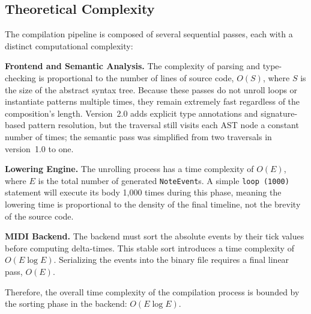 \subsection{Theoretical Complexity}\label{detail-subsec:theoretical-complexity}

The compilation pipeline is composed of several sequential passes, each with a distinct computational complexity:

\noindent \textbf{Frontend and Semantic Analysis.} The complexity of parsing and type-checking is proportional to the
number of lines of source code, $O(S)$, where $S$ is the size of the abstract syntax tree.
Because these passes do not unroll loops or instantiate patterns multiple times, they remain extremely fast regardless
of the composition's length.
Version~2.0 adds explicit type annotations and signature-based pattern resolution, but the traversal still visits each
AST node a constant number of times; the semantic pass was simplified from two traversals in version~1.0 to one.

\noindent \textbf{Lowering Engine.} The unrolling process has a time complexity of $O(E)$, where $E$ is the total number
of generated \texttt{NoteEvent}s.
A simple \texttt{loop (1000)} statement will execute its body 1,000 times during this phase, meaning the lowering time
is proportional to the density of the final timeline, not the brevity of the source code.

\noindent \textbf{MIDI Backend.} The backend must sort the absolute events by their tick values before computing
delta-times.
This stable sort introduces a time complexity of $O(E \log E)$.
Serializing the events into the binary file requires a final linear pass, $O(E)$.

Therefore, the overall time complexity of the compilation process is bounded by the sorting phase in the backend:
$O(E \log E)$.
